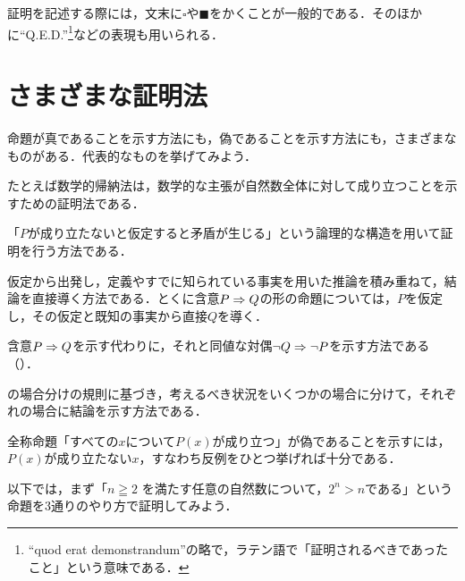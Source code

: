 \begin{mycolumn}
  証明を記述する際には，文末に$\square$や$\blacksquare$をかくことが一般的である．そのほかに``Q.E.D.''\footnote{``quod erat demonstrandum''の略で，ラテン語で「証明されるべきであったこと」という意味である．}などの表現も用いられる．
\end{mycolumn}

\section{さまざまな証明法}

命題が真であることを示す方法にも，偽であることを示す方法にも，さまざまなものがある．代表的なものを挙げてみよう．

\begin{description}[descnext]
  \item[帰納法\index{きのうほう@帰納法}]
        たとえば数学的帰納法は，数学的な主張が自然数全体に対して成り立つことを示すための証明法である．
  \item[背理法\index{はいりほう@背理法}]
        「$P$が成り立たないと仮定すると矛盾が生じる」という論理的な構造を用いて証明を行う方法である．
  \item[直接証明\index{ちょくせつしょうめい@直接証明}]
        仮定から出発し，定義やすでに知られている事実を用いた推論を積み重ねて，結論を直接導く方法である．とくに含意$P \mathrel{\Rightarrow} Q$の形の命題については，$P$を仮定し，その仮定と既知の事実から直接$Q$を導く．
  \item[対偶法\index{たいぐうほう@対偶法}]
        含意$P \mathrel{\Rightarrow} Q$を示す代わりに，それと同値な対偶$\lnot Q \mathrel{\Rightarrow} \lnot P$を示す方法である（）．
  \item[場合分け\index{ばあいわけ@場合分け}]
        の場合分けの規則に基づき，考えるべき状況をいくつかの場合に分けて，それぞれの場合に結論を示す方法である．
  \item[反例による反証\index{はんれい@反例}]
        全称命題「すべての$x$について$P(x)$が成り立つ」が偽であることを示すには，$P(x)$が成り立たない$x$，すなわち反例をひとつ挙げれば十分である．
\end{description}

以下では，まず「$n \geqq 2$ を満たす任意の自然数について，$2^n > n$である」という命題を3通りのやり方で証明してみよう．

